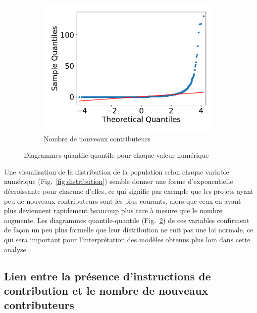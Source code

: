 \documentclass[dvipsnames,runningheads]{llncs}
\begin{document}
\begin{figure}[ht]
\begin{subfigure}[t]{0.3\textwidth}
            \includegraphics[width=\textwidth]{../experiment/data_analysis/newContributorCount_qqplot}
            \caption{Nombre de nouveaux contributeurs}
            \label{sfig:newContributorQQplot}
        \end{subfigure}

        \caption{Diagrammes quantile-quantile pour chaque valeur numérique}
        \label{fig:qqplots}
    \end{figure}

    Une visualisation de la distribution de la population selon chaque variable numérique
    (Fig.~\ref{fig:distribution}) semble donner une forme d'exponentielle décroissante pour chacune d'elles,
    ce qui signifie par exemple que les projets ayant peu de nouveaux contributeurs sont les plus courants,
    alors que ceux en ayant plus deviennent rapidement beaucoup plus rare à mesure que le nombre augmente. Les
    diagrammes quantile-quantile (Fig.~\ref{fig:qqplots}) de ces variables confirment de façon un peu plus
    formelle que leur distribution ne suit pas une loi normale, ce qui sera important pour l'interprétation
    des modèles obtenus plus loin dans cette analyse.

    \subsection{Lien entre la présence d'instructions de contribution et le nombre de nouveaux contributeurs}
\end{document}
